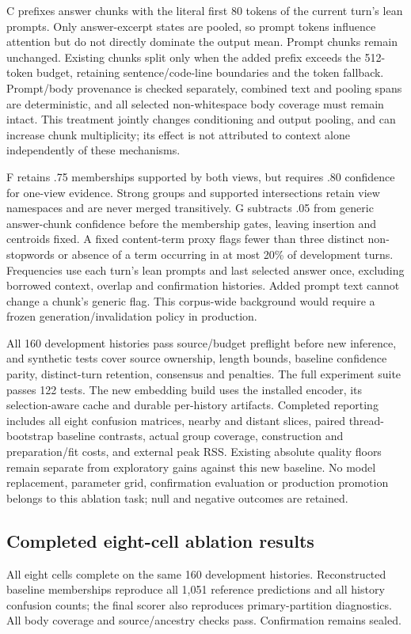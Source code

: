 \documentclass[11pt]{article}
\begin{document}
C prefixes answer chunks with the literal first 80 tokens of the current
turn's lean prompts. Only answer-excerpt states are pooled, so prompt tokens
influence attention but do not directly dominate the output mean. Prompt chunks
remain unchanged. Existing chunks split only when the added prefix exceeds the
512-token budget, retaining sentence/code-line boundaries and the token
fallback. Prompt/body provenance is checked separately, combined text and
pooling spans are deterministic, and all selected non-whitespace body coverage
must remain intact. This treatment jointly changes conditioning and output
pooling, and can increase chunk multiplicity; its effect is not attributed to
context alone independently of these mechanisms.

F retains .75 memberships supported by both views, but requires .80 confidence
for one-view evidence. Strong groups and supported intersections retain view
namespaces and are never merged transitively. G subtracts .05 from generic
answer-chunk confidence before the membership gates, leaving insertion and
centroids fixed. A fixed content-term proxy flags fewer than three distinct
non-stopwords or absence of a term occurring in at most 20\% of development
turns. Frequencies use each turn's lean prompts and last selected answer once,
excluding borrowed context, overlap and confirmation histories. Added prompt
text cannot change a chunk's generic flag. This corpus-wide background would
require a frozen generation/invalidation policy in production.

All 160 development histories pass source/budget preflight before new
inference, and synthetic tests cover source ownership, length bounds, baseline
confidence parity, distinct-turn retention, consensus and penalties. The full
experiment suite passes 122 tests. The new embedding build uses the installed
encoder, its selection-aware cache and durable per-history artifacts. Completed
reporting includes all eight confusion matrices, nearby and distant slices,
paired thread-bootstrap baseline contrasts, actual group coverage, construction
and preparation/fit costs, and external peak RSS. Existing absolute quality
floors remain separate from exploratory gains against this new baseline.
No model replacement, parameter grid, confirmation evaluation or production
promotion belongs to this ablation task; null and negative outcomes are retained.

\subsection{Completed eight-cell ablation results}
All eight cells complete on the same 160 development histories. Reconstructed
baseline memberships reproduce all 1,051 reference predictions and all history
confusion counts; the final scorer also reproduces primary-partition diagnostics.
All body coverage and source/ancestry checks pass. Confirmation remains sealed.
\end{document}
